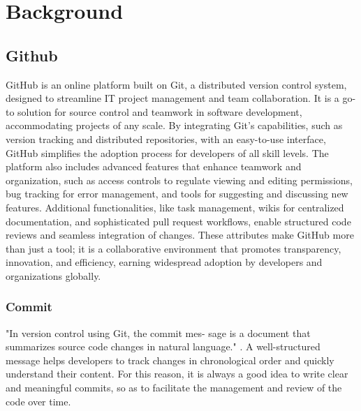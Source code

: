 \chapter{Background}\label{chap:background}
\thispagestyle{plain}

\section{Github}
GitHub is an online platform built on Git, a distributed version control system, designed to streamline IT project management and team collaboration. It is a go-to solution for source control and teamwork in software development, accommodating projects of any scale. By integrating Git's capabilities, such as version tracking and distributed repositories, with an easy-to-use interface, GitHub simplifies the adoption process for developers of all skill levels. The platform also includes advanced features that enhance teamwork and organization, such as access controls to regulate viewing and editing permissions, bug tracking for error management, and tools for suggesting and discussing new features. Additional functionalities, like task management, wikis for centralized documentation, and sophisticated pull request workflows, enable structured code reviews and seamless integration of changes. These attributes make GitHub more than just a tool; it is a collaborative environment that promotes transparency, innovation, and efficiency, earning widespread adoption by developers and organizations globally.
\subsection{Commit}
"In version control using Git, the commit mes- sage is a document that summarizes source code changes in natural language." \citet{jung-2021-commitbert}.
 A well-structured message helps developers to track changes in chronological order and quickly understand their content. For this reason, it is always a good idea to write clear and meaningful commits, so as to facilitate the management and review of the code over time.

